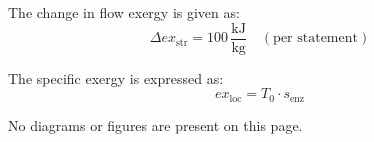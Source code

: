 The change in flow exergy is given as:  
\[
\Delta ex_{\text{str}} = 100 \, \frac{\text{kJ}}{\text{kg}} \quad (\text{per statement})
\]  

The specific exergy is expressed as:  
\[
ex_{\text{loc}} = T_0 \cdot s_{\text{enz}}
\]  

No diagrams or figures are present on this page.